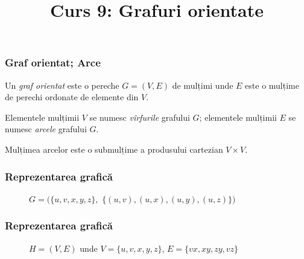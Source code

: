 
\title{Curs 9: Grafuri orientate}



\maketitle


\begin{frame}
  \frametitle{Graf orientat; Arce}

\begin{definition}
Un \emph{graf orientat} este o pereche $G=(V,E)$ de mulțimi unde $E$ este o mulțime de perechi ordonate de elemente din $V$. 
\end{definition}

Elementele mulțimii $V$ se numesc \emph{vîrfurile} grafului $G$; elementele mulțimii $E$ se numesc \emph{arcele} grafului $G$.

Mulțimea arcelor este o submulțime a produsului cartezian $V\times V$. 

\end{frame}

\begin{frame}
  \frametitle{Reprezentarea grafică}

\begin{figure}
\centering%
\caption{$G=(\{u,v,x,y,z\},$ $\{(u,v),(u,x),(u,y),(u,z)\})$}
\end{figure}

\end{frame}

\begin{frame}
  \frametitle{Reprezentarea grafică}

\begin{figure}
\centering%
%
\caption{$H=(V,E)$ unde $V=\{u,v,x,y,z\}$, $E=\{vx,xy,zy,vz\}$}
\end{figure}

\end{frame}

